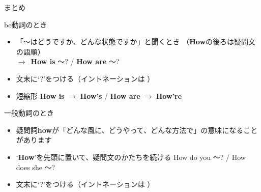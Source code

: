 \documentclass[aspectratio=169,xcolor={dvipsnames,table}]{beamer}
\begin{document}
\begin{frame}[plain]{まとめ}
 \begin{block}{be動詞のとき}\small
\begin{itemize}[square]\small
 \item 「〜はどうですか、どんな状態ですか」と聞くとき
（{\bfseries How}の後ろは疑問文の語順）\\
$\longrightarrow$\,\,\,{\bfseries How is} 〜? / {\bfseries How are} 〜?
 \item   文末に`?'をつける（イントネーションは\myDownwardPitch{}\,\,）
 \item 短縮形 {\bfseries How is} $\longrightarrow$ {\bfseries How's} / {\bfseries How are} $\longrightarrow$ {\bfseries How're}
\end{itemize}
     \end{block}

\begin{block}{一般動詞のとき}\small
\begin{itemize}[square]\small
 \item 疑問詞{\bfseries how}が「どんな風に、どうやって、どんな方法で」の意味になることがあります
 \item `{\bfseries How}'を先頭に置いて、疑問文のかたちを続ける\,\,How do you  〜? / How does she 〜? 
 \item   文末に`?'をつける（イントネーションは\myDownwardPitch{}\,\,）
\end{itemize}
     \end{block}
\end{frame}
\end{document}
